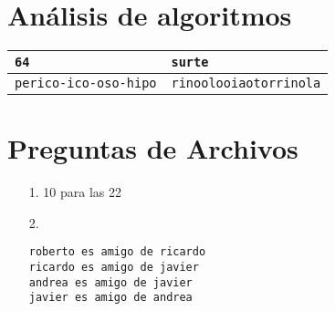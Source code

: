 \section{Análisis de algoritmos}
\begin{table}[htbp]
\begin{center}
\begin{tabular}{|l|l|}
\hline
\texttt{64} & \texttt{surte} \\ \hline
\texttt{perico-ico-oso-hipo} & \texttt{rinoolooiaotorrinola} \\ \hline
\end{tabular}
\end{center}
\end{table}

\section{Preguntas de Archivos}
\begin{itemize}
    \item[1.] 10 para las 22
    \item[2.]  \begin{lstlisting}[style=consola]
roberto es amigo de ricardo
ricardo es amigo de javier
andrea es amigo de javier
javier es amigo de andrea
\end{lstlisting}
\end{itemize}